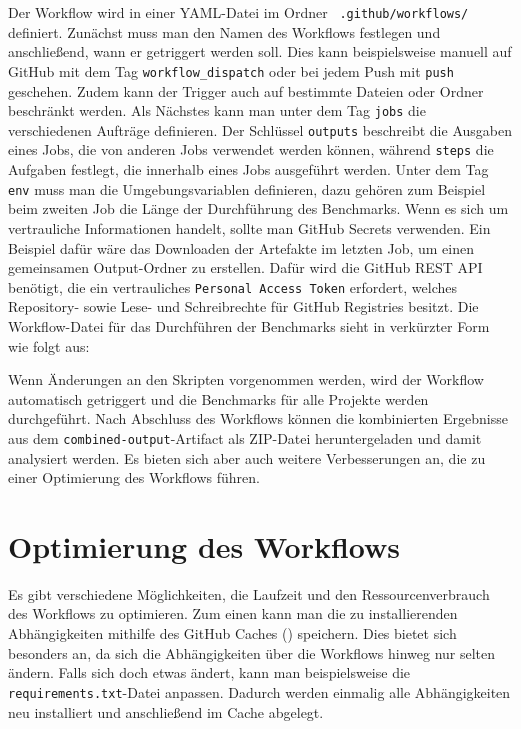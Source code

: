 Der Workflow wird in einer YAML-Datei im Ordner ~\texttt{.github/workflows/} definiert.
Zunächst muss man den Namen des Workflows festlegen und anschließend, wann er getriggert werden soll.
Dies kann beispielsweise manuell auf GitHub mit dem Tag \texttt{workflow\_dispatch} oder bei jedem Push mit \texttt{push} geschehen.
Zudem kann der Trigger auch auf bestimmte Dateien oder Ordner beschränkt werden.
Als Nächstes kann man unter dem Tag \texttt{jobs} die verschiedenen Aufträge definieren.
Der Schlüssel \texttt{outputs} beschreibt die Ausgaben eines Jobs, die von anderen Jobs verwendet werden können, während \texttt{steps} die Aufgaben festlegt, die innerhalb eines Jobs ausgeführt werden.
Unter dem Tag \texttt{env} muss man die Umgebungsvariablen definieren, dazu gehören zum Beispiel beim zweiten Job die Länge der Durchführung des Benchmarks.
Wenn es sich um vertrauliche Informationen handelt, sollte man GitHub Secrets verwenden.
Ein Beispiel dafür wäre das Downloaden der Artefakte im letzten Job, um einen gemeinsamen Output-Ordner zu erstellen.
Dafür wird die GitHub REST API benötigt, die ein vertrauliches \texttt{Personal Access Token} erfordert, welches Repository- sowie Lese- und Schreibrechte für GitHub Registries besitzt.
Die Workflow-Datei für das Durchführen der Benchmarks sieht in verkürzter Form wie folgt aus:

\vspace{-5pt}

\vspace{-5pt}

Wenn Änderungen an den Skripten vorgenommen werden, wird der Workflow automatisch getriggert und die Benchmarks für alle Projekte werden durchgeführt.
Nach Abschluss des Workflows können die kombinierten Ergebnisse aus dem \texttt{combined-output}-Artifact als ZIP-Datei heruntergeladen und damit analysiert werden.
Es bieten sich aber auch weitere Verbesserungen an, die zu einer Optimierung des Workflows führen.

\section{Optimierung des Workflows}\label{sec:optimierung-des-workflows}

Es gibt verschiedene Möglichkeiten, die Laufzeit und den Ressourcenverbrauch des Workflows zu optimieren.
Zum einen kann man die zu installierenden Abhängigkeiten mithilfe des GitHub Caches (\cite{github_cache_doku}) speichern.
Dies bietet sich besonders an, da sich die Abhängigkeiten über die Workflows hinweg nur selten ändern.
Falls sich doch etwas ändert, kann man beispielsweise die \texttt{require\allowbreak ments.txt}-Datei anpassen.
Dadurch werden einmalig alle Abhängigkeiten neu installiert und anschließend im Cache abgelegt.

